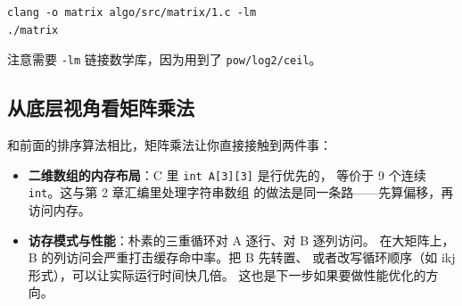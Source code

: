 \begin{lstlisting}[style=bashstyle]
clang -o matrix algo/src/matrix/1.c -lm
./matrix
\end{lstlisting}

注意需要 \texttt{-lm} 链接数学库，因为用到了 \texttt{pow/log2/ceil}。

\subsection{从底层视角看矩阵乘法}

和前面的排序算法相比，矩阵乘法让你直接接触到两件事：

\begin{itemize}
    \item \textbf{二维数组的内存布局}：C 里 \texttt{int A[3][3]} 是行优先的，
        等价于 9 个连续 \texttt{int}。这与第 2 章汇编里处理字符串数组
        的做法是同一条路——先算偏移，再访问内存。
    \item \textbf{访存模式与性能}：朴素的三重循环对 A 逐行、对 B 逐列访问。
        在大矩阵上，B 的列访问会严重打击缓存命中率。把 B 先转置、
        或者改写循环顺序（如 ikj 形式），可以让实际运行时间快几倍。
        这也是下一步如果要做性能优化的方向。
\end{itemize}
